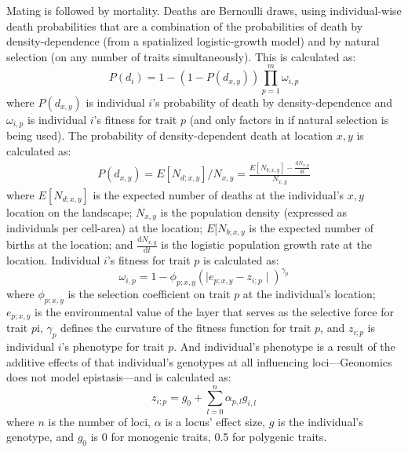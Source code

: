 ﻿\documentclass{article}
\begin{document}
Mating is followed by mortality.
Deaths are Bernoulli draws, using individual-wise death probabilities that are
a combination of the probabilities of death by density-dependence
(from a spatialized logistic-growth model)
and by natural selection (on any number of traits simultaneously). 
This is calculated as:
\begin{equation}
        P(d_{i}) = 1 - (1 - P(d_{x,y})) \prod_{p = 1}^{m}\omega_{i,p}
\label{eqxn:prob_death_i}
\end{equation}
where $P(d_{x,y})$ is individual $i$'s probability of death by density-dependence
and $\omega_{i,p}$ is individual $i$'s fitness for trait $p$
(and only factors in if natural selection is being used).
The probability of density-dependent death at location $x,y$ is calculated as:
\begin{equation}
\begin{split}
       P(d_{x,y}) = E[N_{d;x,y}]/N_{x,y} = \frac{E[N_{b;x,y}] - \frac{\mathrm{d}N_{x,y}}{\mathrm{d}t}}{N_{x,y}}
\label{eqxn:prob_death_xy}
\end{split}
\end{equation}
where $E[N_{d;x,y}]$ is the expected number of deaths at the individual's $x,y$ location on the landscape;
$N_{x,y}$ is the population density (expressed as individuals per cell-area) at the location;
$E[N_{b;x,y}$ is the expected number of births at the location;
and $\frac{\mathrm{d}N_{x,y}}{\mathrm{d}t}$ is the logistic population growth rate at the location.
Individual $i$'s fitness for trait $p$ is calculated as:
\begin{equation}
        \omega_{i,p}= 1 - \phi_{p;x,y} {( \mid e_{p;x,y} - z_{i;p} \mid )}^{\gamma_{p}}
\label{eqxn:fitness}
\end{equation}
where $\phi_{p;x,y}$ is the selection coefficient on trait $p$ at the
individual's location; $e_{p;x,y}$ is the environmental value
of the layer that serves as the selective force for trait $p$i,
$\gamma_{p}$ defines the curvature of the fitness function for trait $p$,
and $z_{i;p}$ is individual $i$'s phenotype for trait $p$.
And individual's phenotype is a result of the additive effects of that
individual's genotypes at all influencing loci---Geonomics does not model
epistasis---and is calculated as:
\begin{equation}
        z_{i;p} = g_{0} + \sum_{l = 0}^{n} \alpha_{p,l} g_{i,l}
\label{eqxn:phenotype}
\end{equation}
where $n$ is the number of loci, $\alpha$ is a locus' effect size, $g$ is the
individual's genotype, and $g_{0}$ is 0 for monogenic traits,
0.5 for polygenic traits. 
\end{document}
